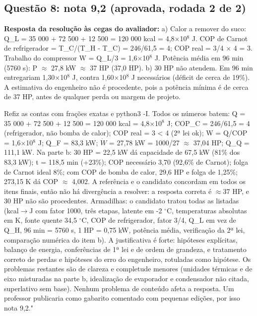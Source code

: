 \documentclass{article}%
\begin{document}
\subsection*{Questão 8: nota 9,2 (aprovada, rodada 2 de 2)}%
\textbf{Resposta da resolução às cegas do avaliador:} a) Calor a remover do suco: Q\_L = 35 000 + 72 500 + 12 500 = 120 000 kcal = 4,8$\times$10$^{8}$ J. COP de Carnot de refrigerador = T\_C/(T\_H - T\_C) = 246/61,5 = 4; COP real = 3/4 $\times$ 4 = 3. Trabalho do compressor W = Q\_L/3 = 1,6$\times$10$^{8}$ J. Potência média em 96 min (5760 s): P $\approx$ 27,8 kW $\approx$ 37 HP (37,0 HP).\newline%
\newline%
b) 30 HP não atendem. Em 96 min entregariam 1,30$\times$10$^{8}$ J, contra 1,60$\times$10$^{8}$ J necessários (déficit de cerca de 19\%). A estimativa do engenheiro não é procedente, pois a potência mínima é de cerca de 37 HP, antes de qualquer perda ou margem de projeto.\par %
Refiz as contas com frações exatas e python3 {-}I. Todos os números batem: Q = 35 000 + 72 500 + 12 500 = 120 000 kcal = 4,8$\times$10$^{8}$ J; COP\_C = 246/61,5 = 4 (refrigerador, não bomba de calor); COP real = 3 < 4 (2ª lei ok); W = Q/COP = 1,6$\times$10$^{8}$ J; Q\_F = 83,3 kW; $\dot W$ = 27,78 kW = 1000/27 $\approx$ 37,04 HP; Q\_Q = 111,1 kW. Na parte b: 30 HP = 22,5 kW dá capacidade de 67,5 kW (81\% dos 83,3 kW); t = 118,5 min (+23\%); COP necessário 3,70 (92,6\% de Carnot); folga de Carnot ideal 8\%; com COP de bomba de calor, 29,6 HP e folga de 1,25\%; 273,15 K dá COP $\approx$ 4,002. A referência e o candidato concordam em todos os itens finais, então não há divergência a resolver: a resposta correta é $\approx$37 HP, e 30 HP não são procedentes. Armadilhas: o candidato tratou todas as listadas (kcal$\to$J com fator 1000, três etapas, latente em -2 $^\circ$C, temperaturas absolutas em K, fonte quente 34,5 $^\circ$C, COP de refrigerador, fator 3/4, Q\_L em vez de Q\_H, 96 min = 5760 s, 1 HP = 0,75 kW, potência média, verificação da 2ª lei, comparação numérica do item b). A justificativa é forte: hipóteses explícitas, balanço de energia, conferências de 1ª lei e de ordem de grandeza, e tratamento correto de perdas e hipóteses do erro do engenheiro, rotuladas como hipótese. Os problemas restantes são de clareza e completude menores (unidades térmicas e de eixo misturadas na parte b, idealização de evaporador e condensador não citada, superlativo sem base). Nenhum problema de conteúdo afeta a resposta. Um professor publicaria como gabarito comentado com pequenas edições, por isso nota 9,2."%
\end{document}
